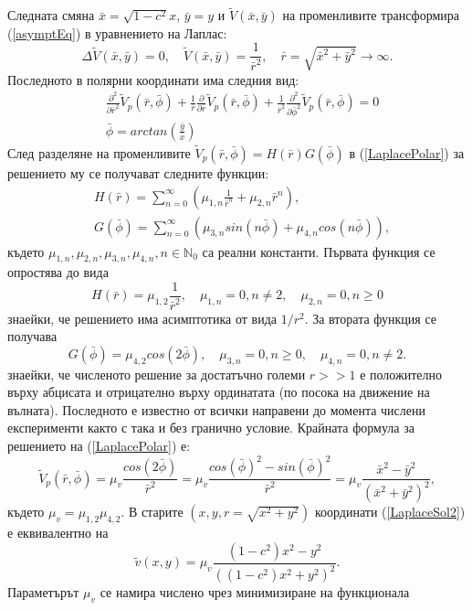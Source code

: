\documentclass{article}
\newcommand{\be}{\begin{equation}}
\newcommand{\ee}{\end{equation}}
\newcommand{\rf}[1]{(\ref{#1})}
\theoremstyle{remark}
\begin{document}
Следната смяна $\bar x  = \sqrt{1-c^2} x$, $\bar y = y$ и $\tilde V (\bar x, \bar y)$ на променливите трансформира \rf{asymptEq} в уравнението на Лаплас:
\be\label{LaplaceEq}
\Delta \tilde V(\bar x, \bar y) = 0, \quad \tilde V(\bar x, \bar y) = \frac{1}{\bar r^2}, \quad \bar r = \sqrt{\bar x^2 + \bar y^2} \rightarrow \infty.
\ee
Последното в полярни координати има следния вид:
\begin{align}\label{LaplacePolar}
&\frac{\partial^2}{\partial \bar r^2} \tilde V_p(\bar r,\bar \phi) + \frac{1}{\bar r} \frac{\partial}{\partial \bar r} \tilde V_p(\bar r, \bar \phi) + \frac{1}{\bar r^2} \frac{\partial^2}{\partial \bar \phi^2} \tilde V_p(\bar r, \bar \phi) = 0 \\
&\bar \phi = arctan(\frac{\bar y}{\bar x}) \nonumber
\end{align}
След разделяне на променливите $\tilde V_p(\bar r, \bar \phi) = H(\bar r) G(\bar \phi)$ в \rf{LaplacePolar} за решението му се получават следните функции:
\begin{align}\label{LaplaceSol}
&H(\bar{r}) = \sum^{\infty}_{n=0} (\mu_{1,n} \frac{1}{ \bar{r}^n} + \mu_{2,n} \bar{r}^n ),
\\ \nonumber &G(\bar \phi) = \sum^{\infty}_{n=0} (\mu_{3,n}sin(n \bar \phi ) + \mu_{4,n}cos(n \bar \phi)),
\end{align}
където $\mu_{1,n}, \mu_{2,n}, \mu_{3,n}, \mu_{4,n}, n \in \mathbb{N}_{0}$ са реални константи. Първата функция се опростява до вида
\be
H(\bar r) = \mu_{1,2}\frac{1}{\bar r^2}, \quad \mu_{1,n} = 0, n \neq 2, \quad \mu_{2,n} = 0, n \ge 0
\ee
знаейки, че решението има асимптотика от вида $1/r^2$. За втората функция се получава
\be
G(\bar \phi) = \mu_{4,2}cos(2 \bar \phi), \quad \mu_{3,n} = 0, n \ge 0, \quad \mu_{4,n} = 0, n \neq 2.
\ee
знаейки, че численото решение за достатъчно големи $r >> 1$ е положително върху абцисата и отрицателно върху ординатата (по посока на движение на вълната). Последното е известно от всички направени до момента числени експерименти както с така и без гранично условие. Крайната формула за решението на \rf{LaplacePolar} е:
\be \label{LaplaceSol2}
\tilde V_p(\bar r, \bar \phi) = \mu_v \frac{ cos(2 \bar \phi) }{ \bar r^2 } = \mu_v \frac{ cos(\bar \phi)^2 - sin(\bar \phi)^2 }{ \bar r^2 } = \mu_v \frac{ \bar x^2 - \bar y^2 }{ (\bar x^2 + \bar y^2)^2 },
\ee
където $\mu_v = \mu_{1,2} \mu_{4,2}$. В старите $(x, y, r=\sqrt{x^2+y^2})$ координати \rf{LaplaceSol2} е еквивалентно на 
\be\label{bndv}
\tilde v(x, y) = \mu_v \frac{ (1-c^2) x^2 - y^2 }{ ((1-c^2) x^2 + y^2)^2 }.
\ee
Параметърът $\mu_v$ се намира числено чрез минимизиране на функционала
\end{document}
